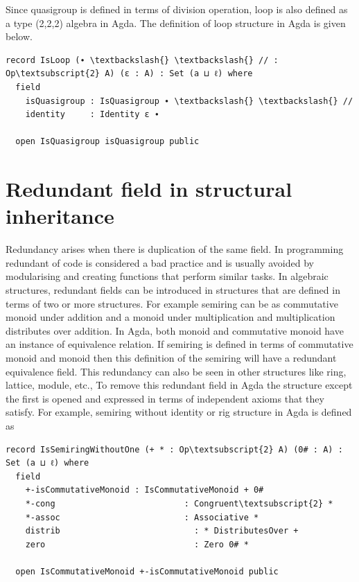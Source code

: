 Since quasigroup is defined in terms of division operation, loop is also defined as a type (2,2,2) algebra in Agda. The definition of loop structure in Agda is given below.\\

\begin{BVerbatim}[commandchars=\\\{\}]
record IsLoop (∙ \textbackslash{} \textbackslash{} // : Op\textsubscript{2} A) (ε : A) : Set (a ⊔ ℓ) where
  field
    isQuasigroup : IsQuasigroup ∙ \textbackslash{} \textbackslash{} //
    identity     : Identity ε ∙

  open IsQuasigroup isQuasigroup public
\end{BVerbatim}

\section{Redundant field in structural inheritance}
Redundancy arises when there is duplication of the same field. In programming redundant of code is considered a bad practice and is usually avoided by modularising and creating functions that perform similar tasks. In algebraic structures, redundant fields can be introduced in structures that are defined in terms of two or more structures. For example semiring can be as commutative monoid under addition and a monoid under multiplication and multiplication distributes over addition. In Agda, both monoid and commutative monoid have an instance of equivalence relation. If semiring is defined in terms of commutative monoid and monoid then this definition of the semiring will have a redundant equivalence field. This redundancy can also be seen in other structures like ring, lattice, module, etc., To remove this redundant field in Agda the structure except the first is opened and expressed in terms of independent axioms that they satisfy. For example, semiring without identity or rig structure in Agda is defined as \\
\begin{Verbatim}[commandchars=\\\{\}]
record IsSemiringWithoutOne (+ * : Op\textsubscript{2} A) (0# : A) : Set (a ⊔ ℓ) where
  field
    +-isCommutativeMonoid : IsCommutativeMonoid + 0#
    *-cong                          : Congruent\textsubscript{2} *
    *-assoc                         : Associative *
    distrib                           : * DistributesOver +
    zero                              : Zero 0# *

  open IsCommutativeMonoid +-isCommutativeMonoid public
\end{Verbatim}
